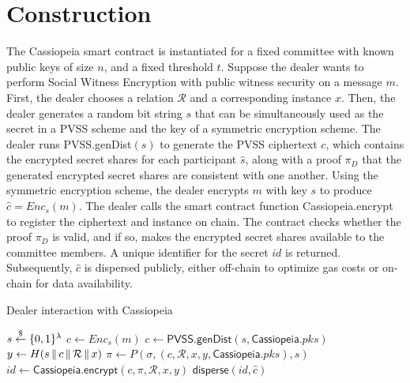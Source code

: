 \section{Construction}\label{construction:without_incentives}
The Cassiopeia smart contract is instantiated for a fixed committee with known public keys of size $n$, and a fixed threshold $t$.
Suppose the dealer wants to perform Social Witness Encryption with public witness security on a message $m$.
First, the dealer chooses a relation $\mathcal{R}$ and a corresponding instance $x$.
Then, the dealer generates a random bit string $s$ that can be simultaneously used as the secret in a PVSS scheme and the key of a symmetric encryption scheme. %
The dealer runs \textsf{PVSS.genDist}$(s)$ to generate the PVSS ciphertext $c$, which contains the encrypted secret shares for each participant $\hat{s}$, along with a proof $\pi_D$ that the generated encrypted secret shares are consistent with one another.
Using the symmetric encryption scheme, the dealer encrypts $m$ with key $s$ to produce $\hat{c} = Enc_s(m)$.
The dealer calls the smart contract function \textsf{Cassiopeia.encrypt} to register the ciphertext and instance on chain.
The contract checks whether the proof $\pi_D$ is valid, and if so, makes the encrypted secret shares available to the committee members. 
A unique identifier for the secret $id$ is returned.
Subsequently, $\hat{c}$ is dispersed publicly, either off-chain to optimize gas costs or on-chain for data availability.

\begin{algorithm}[H]
\caption{Dealer interaction with Cassiopeia}
\label{dealer_alg_no_incentives}
    \begin{algorithmic}[1]
            \State $s \overset{\$}{\gets} \{0,1\}^{\lambda}$
            \State $\hat{c} \gets Enc_s(m)$
            \State $c \gets \textsf{PVSS.genDist}(s, \textsf{Cassiopeia}.pks)$
            \State $y \gets H(s \,\|\, c \,\|\, \mathcal{R} \,\|\, x)$
            \State $\pi \gets P(\sigma, (c, \mathcal{R}, x, y, \textsf{Cassiopeia}.pks), s)$
            \State $id \gets \textsf{Cassiopeia.encrypt}(c, \pi, \mathcal{R}, x, y)$
            \State $\textsf{disperse}(id, \hat{c})$ %
        \EndOn
    \end{algorithmic}
\end{algorithm}

